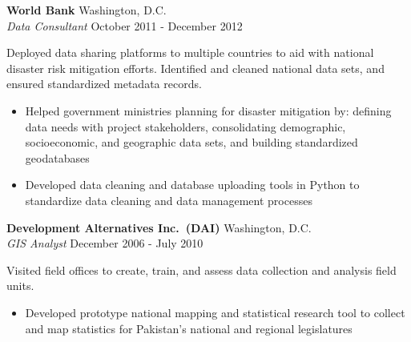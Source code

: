 \documentclass[letterpaper]{article}
\newif\ifDATACV
\newif\ifGISCV
\begin{document}
\textbf{World Bank} 
    \hfill Washington, D.C.\\
    \textit{Data Consultant} 
    \hfill October 2011 - December 2012\\
\vspace{2mm}

Deployed data sharing platforms to multiple countries to aid with national
disaster risk mitigation efforts. Identified and cleaned national data sets, 
and ensured standardized metadata records.
\vspace{-1mm}
\begin{itemize} \itemsep 0pt
    \item Helped government ministries planning for disaster mitigation by:
    defining data needs with project stakeholders, consolidating demographic,
    socioeconomic, and geographic data sets, and building standardized
    geodatabases
    
    \item Developed data cleaning and database uploading tools in Python to 
    standardize data cleaning and data management processes
\end{itemize}


\textbf{Development Alternatives Inc.~(DAI)} 
    \hfill Washington, D.C.\\
    \ifDATACV
        \textit{Principal Development Specialist} 
    \else \ifGISCV
        \textit{GIS Analyst} 
    \fi \fi
    \hfill December 2006 - July 2010\\
\vspace{2mm}

Visited field offices to create, train, and assess data collection and analysis
field units.
\vspace{-1mm}
\begin{itemize} \itemsep 0pt



    \item Developed prototype national mapping and statistical research tool to
    collect and map statistics for Pakistan's national and regional
    legislatures

\end{itemize}
\vspace{2mm}
\end{document}
